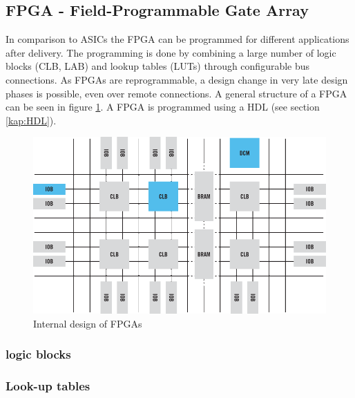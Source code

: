 \subsection{FPGA - Field-Programmable Gate Array}
In comparison to ASICs the FPGA can be programmed for different applications after delivery. The programming is done by combining a large number of logic blocks (CLB, LAB) and lookup tables (LUTs) through configurable bus connections. As FPGAs are reprogrammable, a design change in very late design phases is possible, even over remote connections. A general structure of a FPGA can be seen in figure \ref{fig:fpgablocksgeneral}. A FPGA is programmed using a HDL (see section \ref{kap:HDL}).
\begin{figure}[htbp]
\begin{center}
\includegraphics[width=14cm,keepaspectratio=true]{bilder/png/fpgablocksgeneral}
\caption{Internal design of FPGAs}
\label{fig:fpgablocksgeneral}
\end{center}
\end{figure}
\subsubsection{logic blocks}

\subsubsection{Look-up tables}
